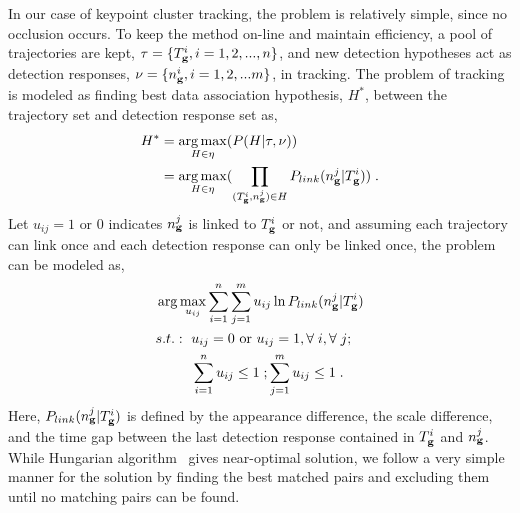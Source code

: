 In our case of keypoint cluster tracking, the problem is relatively simple, since no occlusion occurs. To keep the method on-line and maintain efficiency, a pool of trajectories are kept, $\tau=\{T_{\bf{g}}^i,i=1,2,...,n\}$, and new detection hypotheses act as detection responses, $\nu=\{n_{\bf{g}}^i,i=1,2,...m\}$, in tracking. The problem of tracking is modeled as finding best data association hypothesis, $H^*$, between the trajectory set and detection response set as,
\begin{equation}
\begin{aligned}
{H^*} &= \mathop {\arg \max }\limits_{H \in \eta
} (P(H|\tau,\nu )) \\
&= \mathop {\arg \max }\limits_{H \in \eta }
(\prod\limits_{(T_{\bf{g}}^i,n_{\bf{g}}^j) \in H} {P_{link}(n_{\bf{g}}^j|T_{\bf{g}}^i)} ) \;.
\end{aligned}
\label{eq3}
\end{equation}
Let $u_{ij}=1 \mbox{ or } 0$ indicates $n_{\bf{g}}^j$ is linked to $T_{\bf{g}}^i$ or not, and assuming each trajectory can link once and each detection response can only be linked once, the problem can be modeled as,
\[
\begin{aligned}
&\arg \max\limits_{u_{ij}} \sum\limits_{i = 1}^n \sum\limits_{j = 1}^m u_{ij} \ln P_{link}(n_{\bf{g}}^j|T_{\bf{g}}^i)\\
&
\begin{aligned}
    s.t.:\mbox{ }&u_{ij}=0\mbox{ or }u_{ij}=1,\forall\;i,\forall\;j;\\
    &\sum\limits_{i = 1}^n {u_{ij}} \leq 1\;; \sum\limits_{j = 1}^m {u_{ij}}\leq 1\;.
\end{aligned}
\end{aligned}
\]
Here, $P_{link}(n_{\bf{g}}^j|T_{\bf{g}}^i)$ is defined by the appearance difference, the scale difference, and the time gap between the last detection response contained in $T_{\bf{g}}^i$ and $n_{\bf{g}}^j$. While Hungarian algorithm~\cite{ha} gives near-optimal solution, we follow a very simple manner for the solution by finding the best matched pairs and excluding them until no matching pairs can be found.

